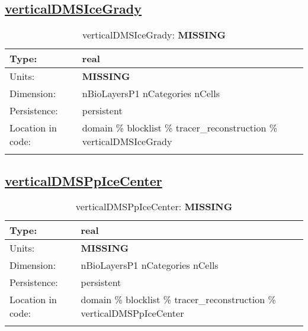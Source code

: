 \subsection[verticalDMSIceGrady]{\hyperref[sec:var_tab_tracer_reconstruction]{verticalDMSIceGrady}}
\label{subsec:var_sec_tracer_reconstruction_verticalDMSIceGrady}
\begin{center}
\begin{longtable}{| p{2.0in} | p{4.0in} |}
        \hline 
        Type: & real \\
        \hline 
        Units: & {\bf \color{red} MISSING} \\
        \hline 
        Dimension: & nBioLayersP1 nCategories nCells \\
        \hline 
        Persistence: & persistent \\
        \hline 
         Location in code: & domain \% blocklist \% tracer\_reconstruction \% verticalDMSIceGrady \\
         \hline 
    \caption{verticalDMSIceGrady: {\bf \color{red} MISSING}}
\end{longtable}
\end{center}
\subsection[verticalDMSPpIceCenter]{\hyperref[sec:var_tab_tracer_reconstruction]{verticalDMSPpIceCenter}}
\label{subsec:var_sec_tracer_reconstruction_verticalDMSPpIceCenter}
\begin{center}
\begin{longtable}{| p{2.0in} | p{4.0in} |}
        \hline 
        Type: & real \\
        \hline 
        Units: & {\bf \color{red} MISSING} \\
        \hline 
        Dimension: & nBioLayersP1 nCategories nCells \\
        \hline 
        Persistence: & persistent \\
        \hline 
         Location in code: & domain \% blocklist \% tracer\_reconstruction \% verticalDMSPpIceCenter \\
         \hline 
    \caption{verticalDMSPpIceCenter: {\bf \color{red} MISSING}}
\end{longtable}
\end{center}
